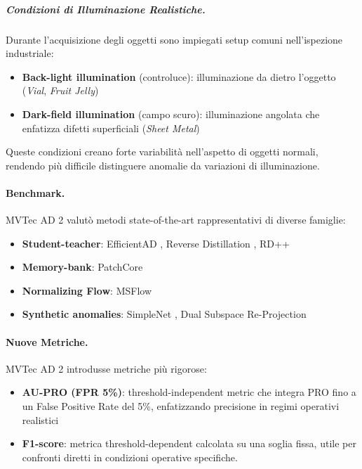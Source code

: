 \subparagraph{Condizioni di Illuminazione Realistiche.} Durante l'acquisizione degli oggetti sono impiegati setup comuni nell'ispezione industriale:
\begin{itemize}
\item \textbf{Back-light illumination} (controluce): illuminazione da dietro l'oggetto (\textit{Vial}, \textit{Fruit Jelly})
\item \textbf{Dark-field illumination} (campo scuro): illuminazione angolata che enfatizza difetti superficiali (\textit{Sheet Metal})
\end{itemize}

Queste condizioni creano forte variabilità nell'aspetto di oggetti normali, rendendo più difficile distinguere anomalie da variazioni di illuminazione.


\paragraph{Benchmark.} MVTec AD 2 valutò metodi state-of-the-art rappresentativi di diverse famiglie:
\begin{itemize}
\item \textbf{Student-teacher}: EfficientAD \cite{batzner2024efficientad}, Reverse Distillation \cite{deng2022anomaly}, RD++ \cite{tien2023revisiting}
\item \textbf{Memory-bank}: PatchCore \cite{roth2022towards}
\item \textbf{Normalizing Flow}: MSFlow \cite{yu2021fastflow}
\item \textbf{Synthetic anomalies}: SimpleNet \cite{liu2023simplenet}, Dual Subspace Re-Projection \cite{zavrtanik2022dsr}
\end{itemize}

\paragraph{Nuove Metriche.} MVTec AD 2 introdusse metriche più rigorose:
\begin{itemize}
\item \textbf{AU-PRO (FPR 5\%)}: threshold-independent metric che integra PRO fino a un False Positive Rate del 5\%, enfatizzando precisione in regimi operativi realistici
\item \textbf{F1-score}: metrica threshold-dependent calcolata su una soglia fissa, utile per confronti diretti in condizioni operative specifiche.
\end{itemize}

